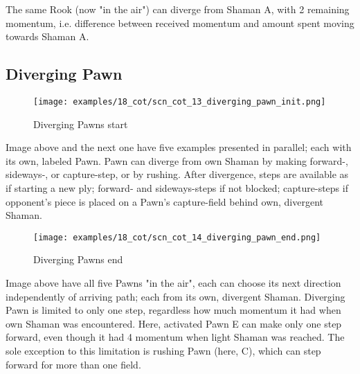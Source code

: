 The same Rook (now "in the air") can diverge from Shaman A, with 2 remaining momentum,
i.e. difference between received momentum and amount spent moving towards Shaman A.

\clearpage %

\subsection*{Diverging Pawn}
\label{sec:Conquest of Tlalocan/Divergence/Diverging Pawn/2} %

\vspace*{-1.4\baselineskip}
\noindent
\begin{figure}[!h]
\texttt{[image: examples/18\_cot/scn\_cot\_13\_diverging\_pawn\_init.png]}
\vspace*{-1.3\baselineskip}
\caption{Diverging Pawns start}
\label{fig:scn_cot_13_diverging_pawn_init}
\end{figure}

\vspace*{-0.5\baselineskip}
Image above and the next one have five examples presented in parallel; each with
its own, labeled Pawn. \newline
\indent
Pawn can diverge from own Shaman by making forward-, sideways-, or capture-step,
or by rushing. After divergence, steps are available as if starting a new ply;
forward- and sideways-steps if not blocked; capture-steps if opponent's piece is
placed on a Pawn's capture-field behind own, divergent Shaman.

\clearpage %

\vspace*{-2.1\baselineskip}
\noindent
\begin{figure}[!h]
\texttt{[image: examples/18\_cot/scn\_cot\_14\_diverging\_pawn\_end.png]}
\vspace*{-1.3\baselineskip}
\caption{Diverging Pawns end}
\label{fig:scn_cot_14_diverging_pawn_end}
\end{figure}

\vspace*{-0.4\baselineskip}
Image above have all five Pawns "in the air", each can choose its next direction
independently of arriving path; each from its own, divergent Shaman. \newline
\indent
Diverging Pawn is limited to only one step, regardless how much momentum it had
when own Shaman was encountered. Here, activated Pawn E can make only one step
forward, even though it had 4 momentum when light Shaman was reached. The sole
exception to this limitation is rushing Pawn (here, C), which can step forward
for more than one field.

